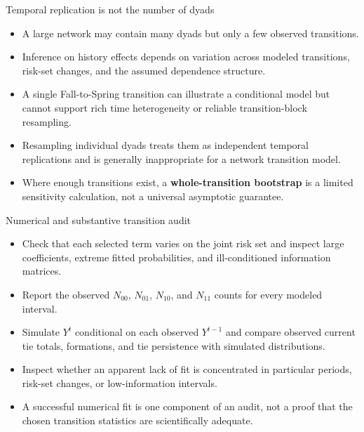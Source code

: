 \documentclass[aspectratio=169,11pt]{beamer}
\newcommand{\term}[1]{\textbf{\color{nupurple}#1}}
\begin{document}
\begin{frame}{Temporal replication is not the number of dyads}
\begin{itemize}
\item A large network may contain many dyads but only a few observed transitions.
\item Inference on history effects depends on variation across modeled transitions, risk-set changes, and the assumed dependence structure.
\item A single Fall-to-Spring transition can illustrate a conditional model but cannot support rich time heterogeneity or reliable transition-block resampling.
\item Resampling individual dyads treats them as independent temporal replications and is generally inappropriate for a network transition model.
\item Where enough transitions exist, a \term{whole-transition bootstrap} is a limited sensitivity calculation, not a universal asymptotic guarantee.
\end{itemize}
\end{frame}

\begin{frame}{Numerical and substantive transition audit}
\begin{itemize}
\item Check that each selected term varies on the joint risk set and inspect large coefficients, extreme fitted probabilities, and ill-conditioned information matrices.
\item Report the observed $N_{00}$, $N_{01}$, $N_{10}$, and $N_{11}$ counts for every modeled interval.
\item Simulate $Y^t$ conditional on each observed $Y^{t-1}$ and compare observed current tie totals, formations, and tie persistence with simulated distributions.
\item Inspect whether an apparent lack of fit is concentrated in particular periods, risk-set changes, or low-information intervals.
\item A successful numerical fit is one component of an audit, not a proof that the chosen transition statistics are scientifically adequate.
\end{itemize}
\end{frame}
\end{document}
